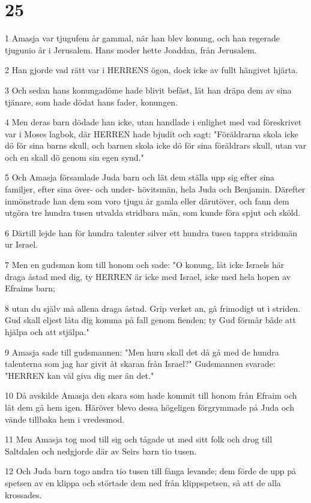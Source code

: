 \chapter{25}

\par 1 Amasja var tjugufem år gammal, när han blev konung, och han regerade tjugunio år i Jerusalem. Hans moder hette Joaddan, från Jerusalem.
\par 2 Han gjorde vad rätt var i HERRENS ögon, dock icke av fullt hängivet hjärta.
\par 3 Och sedan hans konungadöme hade blivit befäst, lät han dräpa dem av sina tjänare, som hade dödat hans fader, konungen.
\par 4 Men deras barn dödade han icke, utan handlade i enlighet med vad föreskrivet var i Moses lagbok, där HERREN hade bjudit och sagt: "Föräldrarna skola icke dö för sina barns skull, och barnen skola icke dö för sina föräldrars skull, utan var och en skall dö genom sin egen synd."
\par 5 Och Amasja församlade Juda barn och lät dem ställa upp sig efter sina familjer, efter sina över- och under- hövitsmän, hela Juda och Benjamin. Därefter inmönstrade han dem som voro tjugu år gamla eller därutöver, och fann dem utgöra tre hundra tusen utvalda stridbara män, som kunde föra spjut och sköld.
\par 6 Därtill lejde han för hundra talenter silver ett hundra tusen tappra stridsmän ur Israel.
\par 7 Men en gudsman kom till honom och sade: "O konung, låt icke Israels här draga åstad med dig, ty HERREN är icke med Israel, icke med hela hopen av Efraims barn;
\par 8 utan du själv må allena draga åstad. Grip verket an, gå frimodigt ut i striden. Gud skall eljest låta dig komma på fall genom fienden; ty Gud förmår både att hjälpa och att stjälpa."
\par 9 Amasja sade till gudsmannen: "Men huru skall det då gå med de hundra talenterna som jag har givit åt skaran från Israel?" Gudsmannen svarade: "HERREN kan väl giva dig mer än det."
\par 10 Då avskilde Amasja den skara som hade kommit till honom från Efraim och lät dem gå hem igen. Häröver blevo dessa högeligen förgrymmade på Juda och vände tillbaka hem i vredesmod.
\par 11 Men Amasja tog mod till sig och tågade ut med sitt folk och drog till Saltdalen och nedgjorde där av Seirs barn tio tusen.
\par 12 Och Juda barn togo andra tio tusen till fånga levande; dem förde de upp på spetsen av en klippa och störtade dem ned från klippspetsen, så att de alla krossades.
